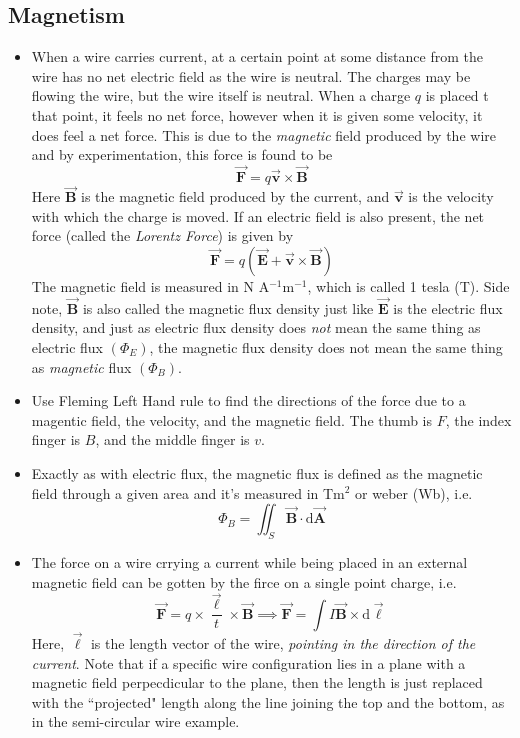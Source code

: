 \documentclass{scrartcl}
\begin{document}
    \subsection{Magnetism}
    \begin{itemize}
        \item When a wire carries current, at a certain point at some distance from the wire has no net electric field as the wire is neutral. The charges may be flowing  the wire, but the wire itself is neutral. When a charge $q$ is placed t that point, it feels no net force, however when it is given some velocity, it does feel a net force. This is due to the \textit{magnetic} field produced by the wire and by experimentation, this force is found to be \[\boxed{\vec{\mathbf F}=q\vec{\mathbf v}\times\vec{\mathbf B}}\] Here $\vec{\mathbf B}$ is the magnetic field produced by the current, and $\vec{\mathbf v}$ is the velocity with which the charge is moved. If an electric field is also present, the net force (called the \textit{Lorentz Force}) is given by \[\boxed{\vec{\mathbf F}=q\left(\vec{\mathbf E}+\vec{\mathbf v}\times\vec{\mathbf B}\right)}\] The magnetic field is measured in N A$^{-1}$m$^{-1}$, which is called 1 tesla (T). Side note, $\vec{\mathbf B}$ is also called the magnetic flux density just like $\vec{\mathbf E}$ is the electric flux density, and just as electric flux density does \textit{not} mean the same thing as electric flux $\left(\Phi_E\right)$, the magnetic flux density does not mean the same thing as \textit{magnetic} flux $\left(\Phi_B\right)$.
        \item Use Fleming Left Hand rule to find the directions of the force due to a magentic field, the velocity, and the magnetic field. The thumb is $F$, the index finger is $B$, and the middle finger is $v$.
        \item Exactly as with electric flux, the magnetic flux is defined as the magnetic field through a given area and it's measured in Tm$^2$ or weber (Wb), i.e. \[\boxed{\Phi_B=\iint_S\vec{\mathbf B}\cdot\mathrm d\vec{\mathbf A}}\]
        \item The force on a wire crrying a current while being placed in an external magnetic field can be gotten by the firce on a single point charge, i.e. \[\vec{\mathbf F}=q\times\frac{\vec{\mathbf\ell}}t\times\vec{\mathbf B}\implies\boxed{\vec{\mathbf F}=\int I\vec{\mathbf B}\times\mathrm d\vec{\mathbf\ell}}\] Here, $\vec{\mathbf\ell}$ is the length vector of the wire, \textit{pointing in the direction of the current}. Note that if a specific wire configuration lies in a plane with a magnetic field perpecdicular to the plane, then the length is just replaced with the ``projected" length along the line joining the top and the bottom, as in the semi-circular wire example.
    \end{itemize}
\end{document}
